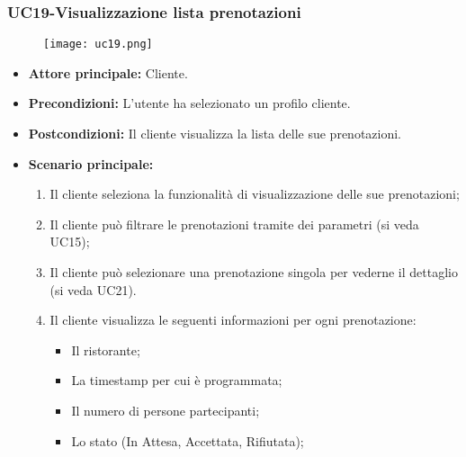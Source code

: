 \subsubsection{UC19-Visualizzazione lista prenotazioni} %
\begin{figure}[h] \texttt{[image: uc19.png]} \end{figure}
\begin{itemize}
    \item \textbf{Attore principale: } Cliente.
    \item \textbf{Precondizioni: }L'utente ha selezionato un profilo cliente.
    \item \textbf{Postcondizioni: }Il cliente visualizza la lista delle sue prenotazioni.
    \item \textbf{Scenario principale:}
        \begin{enumerate}
            \item Il cliente seleziona la funzionalità di visualizzazione delle sue prenotazioni;
            \item Il cliente può filtrare le prenotazioni tramite dei parametri (si veda UC15);
            \item Il cliente può selezionare una prenotazione singola per vederne il dettaglio (si veda UC21).
            \item Il cliente visualizza le seguenti informazioni per ogni prenotazione:
              \begin{itemize}
                \item Il ristorante;
                \item La timestamp per cui è programmata;
                \item Il numero di persone partecipanti;
                \item Lo stato (In Attesa, Accettata, Rifiutata);
              \end{itemize}
        \end{enumerate}
\end{itemize}

